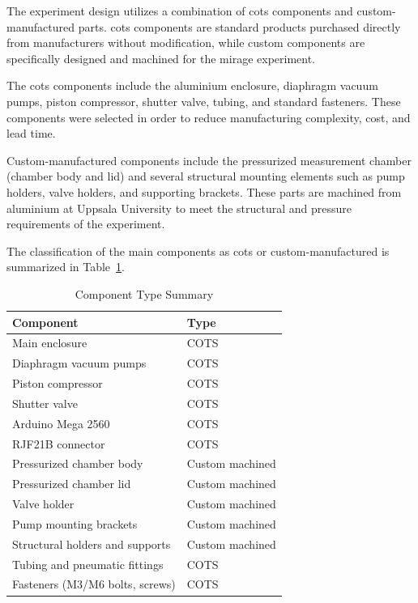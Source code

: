 \documentclass[
  a4paper,
  11pt,
  openany,
  parskip,
  toc=totoc,
  listof=totoc,
  bibliography=totoc
]{scrreprt}
\newcommand{\tref}[1]{Table~\ref{#1}}
\begin{document}
The experiment design utilizes a combination of \gls{cots} components and custom-manufactured parts. \gls{cots} components are standard products purchased directly from manufacturers without modification, while custom components are specifically designed and machined for the \gls{mirage} experiment.

The \gls{cots} components include the aluminium enclosure, diaphragm vacuum pumps, piston compressor, shutter valve, tubing, and standard fasteners. These components were selected in order to reduce manufacturing complexity, cost, and lead time.

Custom-manufactured components include the pressurized measurement chamber (chamber body and lid) and several structural mounting elements such as pump holders, valve holders, and supporting brackets. These parts are machined from aluminium at Uppsala University to meet the structural and pressure requirements of the experiment.

The classification of the main components as \gls{cots} or custom-manufactured is summarized in \tref{tab:component_type_summary}.

\begin{table}[htbp]
\centering
\begin{tabular}{ll}
\toprule
\textbf{Component} & \textbf{Type} \\
\midrule

Main enclosure & COTS \\
Diaphragm vacuum pumps & COTS \\
Piston compressor & COTS \\
Shutter valve & COTS \\
Arduino Mega 2560 & COTS \\
RJF21B connector & COTS \\

Pressurized chamber body & Custom machined \\
Pressurized chamber lid & Custom machined \\
Valve holder & Custom machined \\
Pump mounting brackets & Custom machined \\
Structural holders and supports & Custom machined \\

Tubing and pneumatic fittings & COTS \\
Fasteners (M3/M6 bolts, screws) & COTS \\

\bottomrule
\end{tabular}
\caption{Component Type Summary}
\label{tab:component_type_summary}
\end{table}
\end{document}
